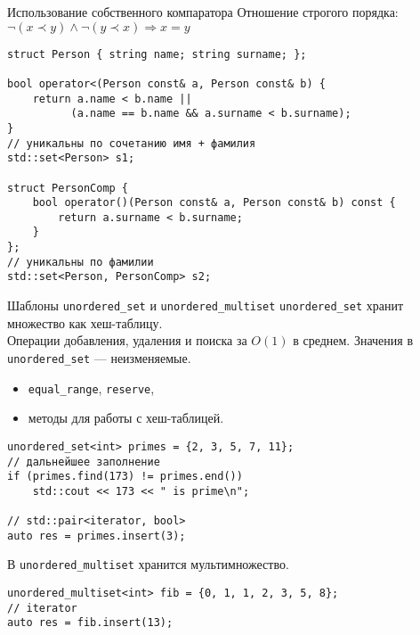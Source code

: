 \documentclass{beamer}
\begin{document}
\begin{frame}[fragile]{Использование собственного компаратора}
Отношение строгого порядка:
$\neg (x \prec y) \land \neg(y \prec x) \Rightarrow x = y$

\begin{lstlisting}
struct Person { string name; string surname; };

bool operator<(Person const& a, Person const& b) {
    return a.name < b.name || 
          (a.name == b.name && a.surname < b.surname);
}
// уникальны по сочетанию имя + фамилия
std::set<Person> s1;

struct PersonComp {
    bool operator()(Person const& a, Person const& b) const {
        return a.surname < b.surname;
    }
};
// уникальны по фамилии
std::set<Person, PersonComp> s2;
\end{lstlisting}
\end{frame}


\begin{frame}[fragile]{Шаблоны {\tt unordered\_set} и {\tt unordered\_multiset}}
\texttt{unordered\_set} хранит множество как хеш-таблицу.\\ 
Операции добавления, удаления и поиска за $O(1)$ в среднем.
Значения в \texttt{unordered\_set} — неизменяемые.
\begin{itemize}
	\item {\tt equal\_range}, {\tt reserve},
	\item методы для работы с хеш-таблицей.
\end{itemize}\vspace{-1mm}

\begin{lstlisting}
unordered_set<int> primes = {2, 3, 5, 7, 11};
// дальнейшее заполнение
if (primes.find(173) != primes.end())
    std::cout << 173 << " is prime\n";
    
// std::pair<iterator, bool>
auto res = primes.insert(3);
\end{lstlisting}
В \texttt{unordered\_multiset} хранится мультимножество.
\vspace{-1mm}
\begin{lstlisting}
unordered_multiset<int> fib = {0, 1, 1, 2, 3, 5, 8};
// iterator
auto res = fib.insert(13);
\end{lstlisting}
\end{frame}
\end{document}
